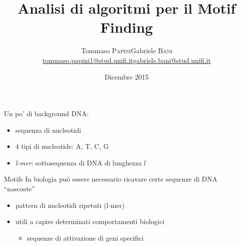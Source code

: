 



	\title[Motif Finding]{Analisi di algoritmi per il Motif Finding}
	\date[11 Dicembre 2015]{ Dicembre 2015}
	
	\author[Papini - Bani]{
		\begin{center}
			\begin{tabular}{lr}
				Tommaso \textsc{Papini}&Gabriele \textsc{Bani}\\
				\href{mailto:tommaso.papini1@stud.unifi.it}{tommaso.papini1@stud.unifi.it}&
				\href{mailto:gabriele.bani@stud.unifi.it}{gabriele.bani@stud.unifi.it}
			\end{tabular}
		\end{center}
	}
	
	
	\begin{frame}[plain]
		\titlepage
	\end{frame}
	
	\begin{frame}{Un po' di background}
		DNA:
		\begin{itemize}
			\item sequenza di nucleotidi
			\item 4 tipi di nucleotide: A, T, C, G
			\item \textit{l-mer}: sottosequenza di DNA di lunghezza $l$
		\end{itemize}
		\begin{block}{Motifs}
			In biologia può essere necessario ricavare certe sequenze di DNA ``nascoste''
			\begin{itemize}
				\item pattern di nucleotidi ripetuti (l-mer)
				\item utili a capire determinati comportamenti biologici
				\begin{itemize}
					\item sequenze di attivazione di geni specifici
				\end{itemize}
			\end{itemize}
		\end{block}
	\end{frame}
	
